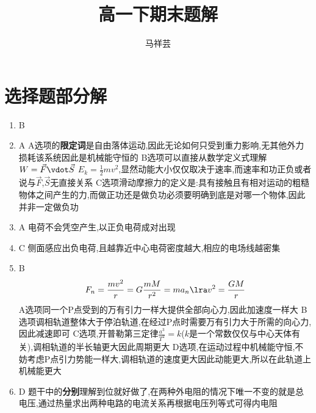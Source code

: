 \documentclass{article}
\title{高一下期末题解}
\author{马祥芸}
\begin{document}
    \maketitle
    \tableofcontents
    \newpage

    \section{选择题部分解}

        \begin{enumerate}
            \item B 
            \item A     \newline
            A选项的\textbf{限定词}是自由落体运动,因此无论如何只受到重力影响,无其他外力损耗该系统因此是机械能守恒的   \newline 
            B选项可以直接从数学定义式理解$ W = \vec{F} \vdot \vec{S} $ \quad $ E_{k} = \frac{1}{2} m v^{2} $,显然动能大小仅仅取决于速率,而速率和功正负或者说与$\vec{F}$,$\vec{S}$无直接关系     \newline
            C选项滑动摩擦力的定义是:具有接触且有相对运动的粗糙物体之间产生的力,而做正功还是做负功必须要明确到底是对哪一个物体,因此并非一定做负功
            \item A     \newline
            电荷不会凭空产生,以正负电荷成对出现
            \item C     \newline 
            侧面感应出负电荷,且越靠近中心电荷密度越大,相应的电场线越密集
            \item B     
            $$
            F_{n} = \frac{m v^{2}}{r} = G\frac{mM}{r^{2}} = m a_{n} \lra v^{2} = \frac{GM}{r}
            $$
            A选项同一个P点受到的万有引力一样大提供全部向心力,因此加速度一样大   \newline
            B选项调相轨道整体大于停泊轨道,在经过P点时需要万有引力大于所需的向心力,因此减速即可  \newline
            C选项,开普勒第三定律$ \frac{a^{3}}{T^{2}} = k $($k$是一个常数仅仅与中心天体有关),调相轨道的半长轴更大因此周期更大   \newline
            D选项,在运动过程中机械能守恒,不妨考虑P点引力势能一样大,调相轨道的速度更大因此动能更大,所以在此轨道上机械能更大
            \item D     \newline
            题干中的\textbf{分别}理解到位就好做了,在两种外电阻的情况下唯一不变的就是总电压,通过热量求出两种电路的电流关系再根据电压列等式可得内电阻

\end{enumerate}
\end{document}
